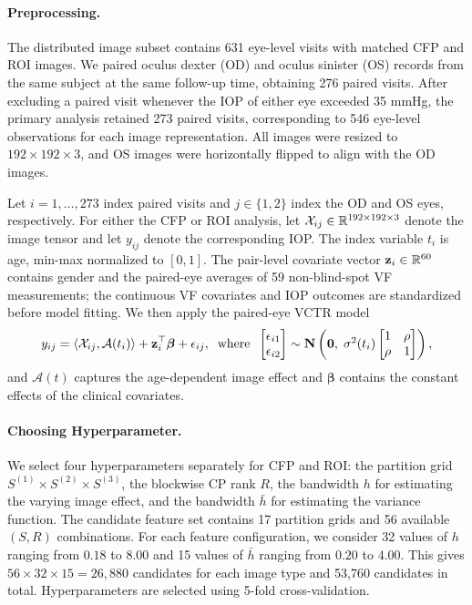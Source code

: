 \documentclass[10pt]{notes}
\begin{document}
\paragraph{Preprocessing.}
The distributed image subset contains 631 eye-level visits with matched CFP and ROI images. We paired oculus dexter (OD) and oculus sinister (OS) records from the same subject at the same follow-up time, obtaining 276 paired visits. After excluding a paired visit whenever the IOP of either eye exceeded 35 mmHg, the primary analysis retained 273 paired visits, corresponding to 546 eye-level observations for each image representation. All images were resized to $192\times192\times3$, and OS images were horizontally flipped to align with the OD images.

Let $i=1,\ldots,273$ index paired visits and $j\in\{1,2\}$ index the OD and OS eyes, respectively. For either the CFP or ROI analysis, let $\mathcal{X}_{ij}\in\mathbb{R}^{192\times192\times3}$ denote the image tensor and let $y_{ij}$ denote the corresponding IOP. The index variable $t_i$ is age, min-max normalized to $[0,1]$. The pair-level covariate vector $\mathbf{z}_i\in\mathbb{R}^{60}$ contains gender and the paired-eye averages of 59 non-blind-spot VF measurements; the continuous VF covariates and IOP outcomes are standardized before model fitting. We then apply the paired-eye VCTR model
\begin{align*}
    y_{ij}
    = \left\langle \mathcal{X}_{ij},\mathcal{A}(t_i)\right\rangle
    + \mathbf{z}_i^\top\boldsymbol{\beta}
    + \epsilon_{ij},
    \;\;\text{where}\;\;
    \begin{bmatrix}
        \epsilon_{i1}\\
        \epsilon_{i2}
    \end{bmatrix}
    \sim
    \bm{\mathrm{N}}\begin{pmatrix}
        \mathbf{0},\;
        \sigma^2(t_i)
        \begin{bmatrix}
            1 & \rho\\
            \rho & 1
        \end{bmatrix}
    \end{pmatrix},
\end{align*}
and $\mathcal{A}(t)$ captures the age-dependent image effect and $\boldsymbol{\beta}$ contains the constant effects of the clinical covariates. 

\paragraph{Choosing Hyperparameter.}
We select four hyperparameters separately for CFP and ROI: the partition grid $S^{(1)}\times S^{(2)}\times S^{(3)}$, the blockwise CP rank $R$, the bandwidth $h$ for estimating the varying image effect, and the bandwidth $\bar h$ for estimating the variance function. The candidate feature set contains 17 partition grids and 56 available $(S,R)$ combinations. For each feature configuration, we consider 32 values of $h$ ranging from $0.18$ to $8.00$ and 15 values of $\bar h$ ranging from $0.20$ to $4.00$. This gives $56\times32\times15=26{,}880$ candidates for each image type and 53,760 candidates in total. Hyperparameters are selected using 5-fold cross-validation. 
\end{document}
